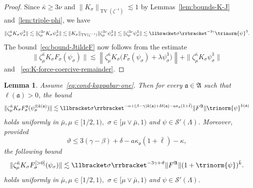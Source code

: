 \documentclass{article}
\numberwithin{equation}{section}
\theoremstyle{plain}
\newtheorem{lemma}[theorem]{Lemma}
\theoremstyle{definition}
\begin{document}
\begin{proof}
  Since $\bar{\kappa} \geqslant 3 \nu$ and $\|
  K_{\sigma} \|_{\operatorname{TV} (\zeta^{- 1})} \lesssim 1$ by
  Lemmas~\ref{lem:bounds-K-J} and~\ref{lem:triple-phi}, we have
  \[ \| \zeta_{\mu}^{\bar{\kappa}} K_{\sigma} \psi^3_{\sigma} \| \lesssim \|
     \zeta_{\mu}^{3 \nu} K_{\sigma} \psi^3_{\sigma} \| \lesssim \| K_{\sigma}
     \|_{\operatorname{TV} (\zeta^{- 1})}  \| \zeta_{\mu}^{3 \nu} \psi^3_{\sigma} \|
     \lesssim \| \zeta_{\mu}^{3 \nu} \psi^3_{\sigma} \| \lesssim \llbracket
     \sigma \rrbracket^{- 3 \gamma}  \trinorm{ \psi }^3 . \]
  The bound~\eqref{eq:bound-JtildeF} now follows from the estimate
  \[ \| \zeta_{\mu}^{\bar{\kappa}} K_{\sigma} F_{\sigma} (\psi_{\sigma}) \|
     \lesssim 
     \left\|
     \zeta_{\mu}^{\bar\kappa}K_{\sigma}
     \bigl(F_{\sigma}(\psi_{\sigma})
     +\lambda\psi_{\sigma}^{3}\bigr)
     \right\|
      + \| \zeta_{\mu}^{\bar{\kappa}}
     K_{\sigma} \psi^3_{\sigma} \| \]
  and ~\eqref{eq:K-force-coercive-remainder}.
\end{proof}

\begin{lemma}
  \label{lem:control-of-forcing}Assume~\eqref{eq:cond-kappabar-one}.
  Then for every $\mathfrak{a} \in \mathfrak{A}$ such that $\ell
  (\mathfrak{a}) > 0$, the bound
  \begin{equation}
    \| \zeta_{\mu}^{\bar{\kappa}} K_{\sigma} F^{\mathfrak{a}}_{\sigma}
    (\psi^{\otimes k (\mathfrak{a})}_{\sigma}) \| \lesssim \llbracket \sigma
    \rrbracket^{- \alpha + (\beta - \gamma) k (\mathfrak{a}) + \delta \ell
    (\mathfrak{a}) - a \kappa_{\mathfrak{o}} (1 + \bar{\ell})}  \|
    F^{\mathfrak{A}} \|  {\trinorm{ \psi }^{k (\mathfrak{a})}} 
    \label{eq:est-F-a}
  \end{equation}
  holds uniformly in $\bar{\mu}, \mu \in [1 / 2, 1),$ $\sigma \in [\mu \vee
  \bar{\mu}, 1) $ and $\psi \in \mathcal{S}' (\Lambda)$. Moreover, provided
  \begin{equation}
    \vartheta \leqslant 3 (\gamma - \beta) + \delta - a \kappa_{\mathfrak{o}}
    (1 + \bar{\ell}) - \kappa, \label{eq:choice-zeta}
  \end{equation}
  the following bound
  \[ \| \zeta_{\mu}^{\bar{\kappa}} K_{\sigma} F^{[> 0]}_{\sigma}
     (\psi_{\sigma}) \| \lesssim \llbracket \sigma \rrbracket^{- 3 \gamma +
     \vartheta}  \| F^{\mathfrak{A}} \|  (1 + \trinorm{ \psi }
     )^{\bar{k}} . \]
  holds uniformly in $\bar{\mu}, \mu \in [1 / 2, 1),$ $\sigma \in [\mu \vee
  \bar{\mu}, 1) $ and $\psi \in \mathcal{S}' (\Lambda)$.
\end{lemma}
\end{document}

